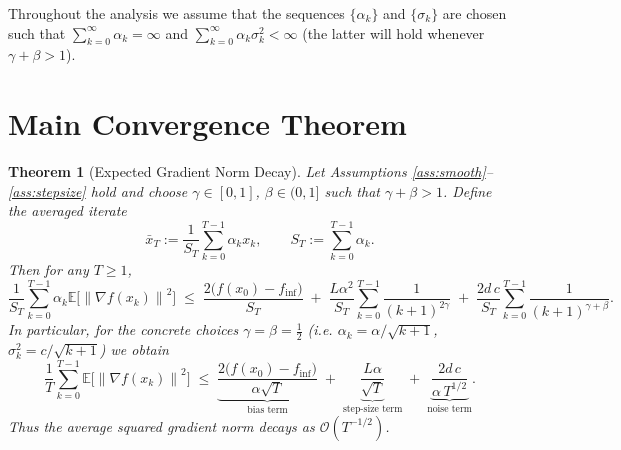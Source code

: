 \documentclass[11pt]{article}
\newtheorem{theorem}{Theorem}
\newcommand{\E}{\mathbb{E}}
\newcommand{\norm}[1]{\left\|#1\right\|}
\begin{document}
Throughout the analysis we assume that the sequences
$\{\alpha_k\}$ and $\{\sigma_k\}$ are chosen such that
$\sum_{k=0}^{\infty}\alpha_k=\infty$ and
$\sum_{k=0}^{\infty}\alpha_k\sigma_k^2<\infty$ (the latter will hold
whenever $\gamma+\beta>1$).

\section*{Main Convergence Theorem}
\begin{theorem}[Expected Gradient Norm Decay]\label{thm:main}
Let Assumptions \ref{ass:smooth}–\ref{ass:stepsize} hold and
choose $\gamma\in[0,1]$, $\beta\in(0,1]$ such that $\gamma+\beta>1$.
Define the averaged iterate
\[
\bar x_T:=\frac{1}{S_T}\sum_{k=0}^{T-1}\alpha_k x_k,
\qquad 
S_T:=\sum_{k=0}^{T-1}\alpha_k .
\]
Then for any $T\ge1$,
\[
\frac{1}{S_T}\sum_{k=0}^{T-1}\alpha_k
\E\!\bigl[\norm{\nabla f(x_k)}^2\bigr]
\;\le\;
\frac{2\bigl(f(x_0)-f_{\inf}\bigr)}{S_T}
\;+\;
\frac{L\alpha^2}{S_T}\sum_{k=0}^{T-1}\frac{1}{(k+1)^{2\gamma}}
\;+\;
\frac{2d\,c}{S_T}\sum_{k=0}^{T-1}\frac{1}{(k+1)^{\gamma+\beta}} .
\tag{6}
\]
In particular, for the concrete choices
$\gamma=\beta=\tfrac12$ (i.e. $\alpha_k=\alpha/\sqrt{k+1}$,
$\sigma_k^2=c/\sqrt{k+1}$) we obtain
\[
\frac{1}{T}\sum_{k=0}^{T-1}
\E\!\bigl[\norm{\nabla f(x_k)}^2\bigr]
\;\le\;
\underbrace{\frac{2\bigl(f(x_0)-f_{\inf}\bigr)}{\alpha\sqrt{T}}}_{\text{bias term}}
\;+\;
\underbrace{\frac{L\alpha}{\sqrt{T}}}_{\text{step‑size term}}
\;+\;
\underbrace{\frac{2d\,c}{\alpha \,T^{1/2}}}_{\text{noise term}} .
\tag{7}
\]
Thus the average squared gradient norm decays as $\mathcal O(T^{-1/2})$.
\end{theorem}

\end{document}
